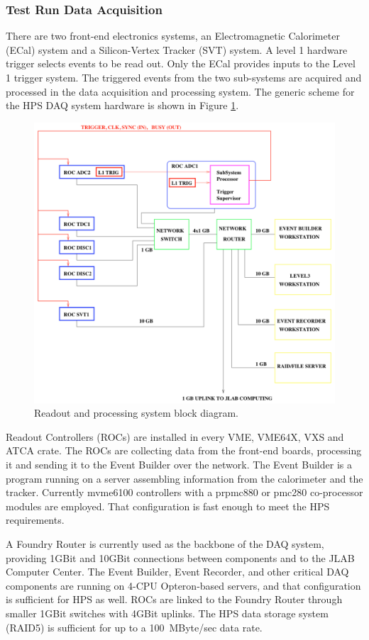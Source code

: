 
\subsubsection{Test Run Data Acquisition}
\label{sec:testrun_daq}
There are two front-end electronics systems, an Electromagnetic Calorimeter (ECal) system and a Silicon-Vertex Tracker (SVT) system. A level 1 hardware trigger selects events to be read out. Only the ECal provides inputs to the Level 1 trigger system. The triggered events from the two sub-systems are acquired and processed in the data acquisition and processing system. The generic scheme for the HPS DAQ system hardware is shown in Figure \ref{fig:daq}.

 \begin{figure}[h]
\includegraphics[scale=0.35]{test2012/daq/daq_schem.pdf}
\caption{\small{Readout and processing system block diagram.}}\label{fig:daq}
\end{figure}

Readout Controllers (ROCs) are installed in every VME, VME64X, VXS and ATCA crate.  The ROCs are collecting data from the front-end boards, processing it and sending it to the Event Builder over the network. The Event Builder is a program running on a server assembling information from the calorimeter and the  tracker. Currently mvme6100 controllers with a prpmc880 or pmc280 co-processor modules are employed. That configuration is fast enough to meet the HPS requirements.  

A Foundry Router is currently used as the backbone of the DAQ system, providing 1GBit and 10GBit connections between components and to the JLAB Computer Center.  The Event Builder, Event Recorder, and other critical DAQ components are running on 4-CPU Opteron-based servers, and that configuration is sufficient for HPS as well.  ROCs are linked to the Foundry Router through smaller 1GBit switches with 4GBit uplinks. The HPS data storage system (RAID5) is sufficient for up to a 100~MByte/sec data rate. 







